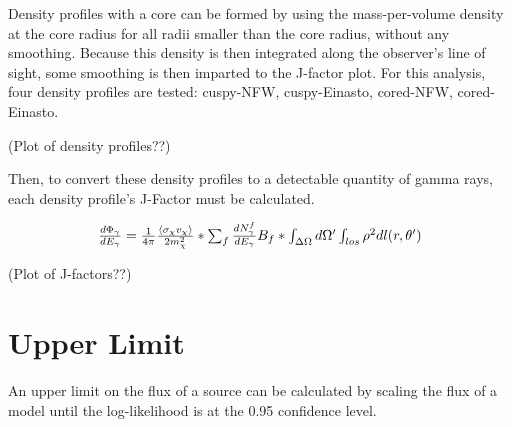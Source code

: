   Density profiles with a core can be formed by using the mass-per-volume density at the core radius for all radii smaller than the core radius, without any smoothing.
  Because this density is then integrated along the observer's line of sight, some smoothing is then imparted to the J-factor plot.
  For this analysis, four density profiles are tested: cuspy-NFW, cuspy-Einasto, cored-NFW, cored-Einasto.

  (Plot of density profiles??)


  Then, to convert these density profiles to a detectable quantity of gamma rays, each density profile's J-Factor must be calculated.


  \begin{equation} \label{eqn:jfactor}
  $$ \frac{d \Phi_{\gamma}}{d E_{\gamma}} = \frac{1}{4\pi} \frac{ \langle \sigma_{\chi} v_{\chi} \rangle }{2 m^{2}_{\chi}} * \sum_{f} \frac{ d N_{\gamma}^{f} }{d E_{\gamma} } B_{f} * \int_{ \Delta \Omega } d \Omega' \int_{los} \rho^{2} d l( r, \theta' )  $$
  \end{equation}


  (Plot of J-factors??)

\section{Upper Limit}
  An upper limit on the flux of a source can be calculated by scaling the flux of a model until the log-likelihood is at the 0.95 confidence level.


